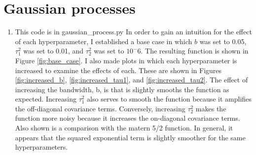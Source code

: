 \documentclass[10pt]{article}
\begin{document}
		\section{Gaussian processes}
        \begin{enumerate}[label=(\Alph*)]
        \item This code is in gaussian\_process.py
        In order to gain an intuition for the effect of each hyperparameter, I established a base case in which $b$ was set to 0.05, $\tau_1^2$ was set to 0.01, and $\tau_2^2$ was set to $10^-6$. The resulting function is shown in Figure \ref{fig:base_case}. I also made plots in which each hyperparameter is increased to examine the effects of each. These are shown in Figures \ref{fig:increased_b}, \ref{fig:increased_tau1}, and \ref{fig:increased_tau2}. The effect of increasing the bandwidth, b, is that is slightly smooths the function as expected. Increasing $\tau_1^2$ also serves to smooth the function because it amplifies the off-diagonal covariance terms. Conversely, increasing $\tau_2^2$ makes the function more noisy because it increases the on-diagonal covariance terms. Also shown is a comparison with the matern 5/2 function. In general, it appears that the squared exponential term is slightly smoother for the same hyperparameters. 
        

\end{enumerate}
\end{document}
